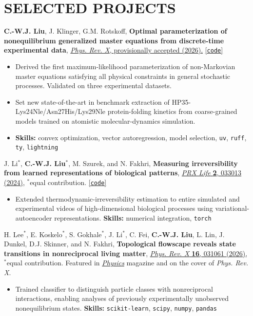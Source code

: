 \documentclass[11pt,letterpaper]{article}
\newcommand{\publication}[1]{#1\par}
\newcommand{\projectsep}{\par\vspace{2pt}}
\begin{document}
\section{SELECTED PROJECTS}
\publication{\textbf{C.-W.J. Liu}, J. Klinger, G.M. Rotskoff, \textbf{Optimal parameterization of nonequilibrium generalized master equations from discrete-time experimental data}, \href{https://doi.org/10.48550/arXiv.2606.28289}{\textit{Phys. Rev. X}, provisionally accepted (2026).} \href{https://github.com/rotskoff-group/GMEx}{[\texttt{code}]}}
\begin{itemize}
\item Derived the first maximum-likelihood parameterization of non-Markovian master equations satisfying all physical constraints in general stochastic processes.
Validated on three experimental datasets.
\item Set new state-of-the-art in benchmark extraction of HP35-Lys24Nle/Asn27His/Lys29Nle protein-folding kinetics from coarse-grained models trained on atomistic molecular-dynamics simulation.
\item \textbf{Skills:} convex optimization, vector autoregression, model selection, \texttt{uv}, \texttt{ruff}, \texttt{ty}, \texttt{lightning}
\end{itemize}
\projectsep
\publication{J. Li$^*$, \textbf{C.-W.J. Liu}$^*$, M. Szurek, and N. Fakhri, \textbf{Measuring irreversibility from learned representations of biological patterns}, \href{https://doi.org/10.1103/PRXLife.2.033013}{\textit{PRX Life} \textbf{2}, 033013 (2024),} $^*$equal contribution. \href{https://github.com/cjoshliu/irreversibility-from-representations}{[\texttt{code}]}}
\begin{itemize}
\item Extended thermodynamic-irreversibility estimation to entire simulated and experimental videos of high-dimensional biological processes using variational-autoencoder representations.
\textbf{Skills:} numerical integration, \texttt{torch}
\end{itemize}
\projectsep
\publication{H. Lee$^*$, E. Koskelo$^*$, S. Gokhale$^*$, J. Li$^*$, C. Fei, \textbf{C.-W.J. Liu}, L. Lin, J. Dunkel, D.J. Skinner, and N. Fakhri, \textbf{Topological flowscape reveals state transitions in nonreciprocal living matter}, \href{https://doi.org/10.1103/tq6h-f5ws}{\textit{Phys. Rev. X} \textbf{16}, 031061 (2026)}, $^*$equal contribution. Featured in \href{https://physics.aps.org/articles/v19/115}{\textit{Physics}} magazine and on the cover of \textit{Phys. Rev. X}.}
\begin{itemize}
\item Trained classifier to distinguish particle classes with nonreciprocal interactions, enabling analyses of previously experimentally unobserved nonequilibrium states.
\textbf{Skills:} \texttt{scikit-learn}, \texttt{scipy}, \texttt{numpy}, \texttt{pandas}
\end{itemize}
\end{document}
